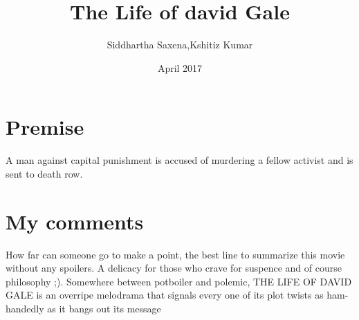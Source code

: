 \documentclass{article}
\title{The Life of david Gale}
\author{Siddhartha Saxena,Kshitiz Kumar}
\date{April 2017}
\begin{document}
\maketitle

\section{Premise}
A man against capital punishment is accused of murdering a fellow activist and is sent to death row.
\section{My comments}
How far can someone go to make a point, the best line to summarize this movie without any spoilers. A delicacy for those who crave for suspence and of course philosophy ;).
Somewhere between potboiler and polemic, THE LIFE OF DAVID GALE is an overripe melodrama that signals every one of its plot twists as ham-handedly as it bangs out its message 
\end{document}
